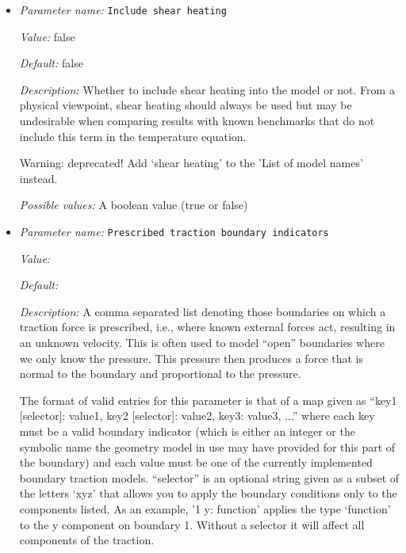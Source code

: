 \begin{itemize}
{\it Possible values:} A boolean value (true or false)
\item {\it Parameter name:} {\tt Include shear heating}
\label{parameters:Model settings/Include shear heating}


{\it Value:} false


{\it Default:} false


{\it Description:} Whether to include shear heating into the model or not. From a physical viewpoint, shear heating should always be used but may be undesirable when comparing results with known benchmarks that do not include this term in the temperature equation.

Warning: deprecated! Add `shear heating' to the 'List of model names' instead.


{\it Possible values:} A boolean value (true or false)
\item {\it Parameter name:} {\tt Prescribed traction boundary indicators}
\label{parameters:Model settings/Prescribed traction boundary indicators}


{\it Value:} 


{\it Default:} 


{\it Description:} A comma separated list denoting those boundaries on which a traction force is prescribed, i.e., where known external forces act, resulting in an unknown velocity. This is often used to model ``open'' boundaries where we only know the pressure. This pressure then produces a force that is normal to the boundary and proportional to the pressure.

The format of valid entries for this parameter is that of a map given as ``key1 [selector]: value1, key2 [selector]: value2, key3: value3, ...'' where each key must be a valid boundary indicator (which is either an integer or the symbolic name the geometry model in use may have provided for this part of the boundary) and each value must be one of the currently implemented boundary traction models. ``selector'' is an optional string given as a subset of the letters `xyz' that allows you to apply the boundary conditions only to the components listed. As an example, '1 y: function' applies the type `function' to the y component on boundary 1. Without a selector it will affect all components of the traction.



\end{itemize}
